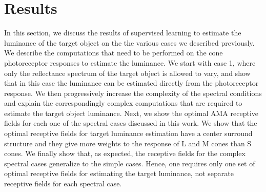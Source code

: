 \documentclass{jov}
\begin{document}

\section{Results} \label{Results}
In this section, we discuss the results of supervised learning to estimate the luminance of the target object on the the various cases we described previously. We describe the computations that need to be performed on the cone photoreceptor responses to estimate the luminance. We start with case 1, where only the reflectance spectrum of the target object is allowed to vary, and show that in this case the luminance can be estimated directly from the photoreceptor response. We then progressively increase the complexity of the spectral conditions and explain the correspondingly complex computations that are required to estimate the target object luminance. Next, we show the optimal AMA receptive fields for each one of the spectral cases discussed in this work. We show that the optimal receptive fields for target luminance estimation have a center surround structure and they give more weights to the response of L and M cones than S cones. We finally show that, as expected, the receptive fields for the complex spectral cases generalize to the simple cases. Hence, one requires only one set of optimal receptive fields for estimating the target luminance, not separate receptive fields for each spectral case.
\end{document}

